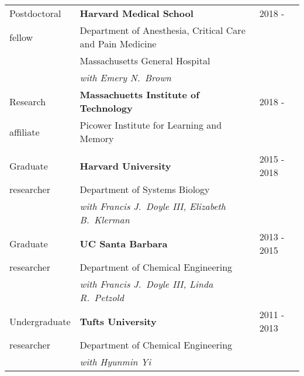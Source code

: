 \documentclass[line,10pt]{res}
\begin{document}
\begin{resume}
\begin{tabular}{p{1.0in} p{4.5in} p{1in}}
 Postdoctoral & \textbf{Harvard Medical School} & 2018 - \\
     fellow   & Department of Anesthesia, Critical Care and Pain Medicine & \\
              & Massachusetts General Hospital & \\
              & \textit{with Emery N.\ Brown} & \\[0.8em]
  Research & \textbf{Massachuetts Institute of Technology} & 2018 - \\
 affiliate & Picower Institute for Learning and Memory & \\
 \null & & \\[0.8em]
 Graduate  & \textbf{Harvard University} & 2015 - 2018\\
researcher & Department of Systems Biology & \\
           & \textit{with Francis J.\ Doyle III, Elizabeth B.\ Klerman} & \\[0.8em]
  Graduate & \textbf{UC Santa Barbara} & 2013 - 2015\\
researcher & Department of Chemical Engineering & \\
           & \textit{with Francis J.\ Doyle III, Linda R.\ Petzold} & \\[0.8em]
 Undergraduate & \textbf{Tufts University} & 2011 - 2013\\
  researcher   & Department of Chemical Engineering & \\
               &\textit{with Hyunmin Yi} & \\
\end{tabular}


\end{resume}
\end{document}
